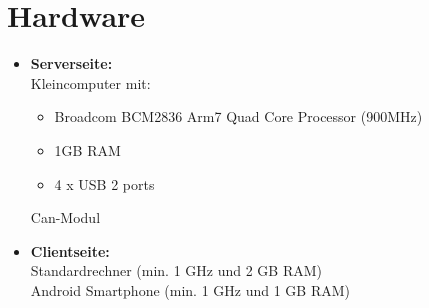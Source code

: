 \documentclass[pflichtenheft.tex]{subfiles}
\begin{document}
\section{Hardware}
\begin{itemize}
\item
\textbf{Serverseite:}\\
Kleincomputer mit:
\begin{itemize}
\item
Broadcom BCM2836 Arm7 Quad Core Processor (900MHz)
\item
1GB RAM
\item
4 x USB 2 ports
\end{itemize}
Can-Modul
\item
\textbf{Clientseite:}\\
Standardrechner (min. 1 GHz und 2 GB RAM)\\
Android Smartphone (min. 1 GHz und 1 GB RAM)
\end{itemize}
\end{document}
